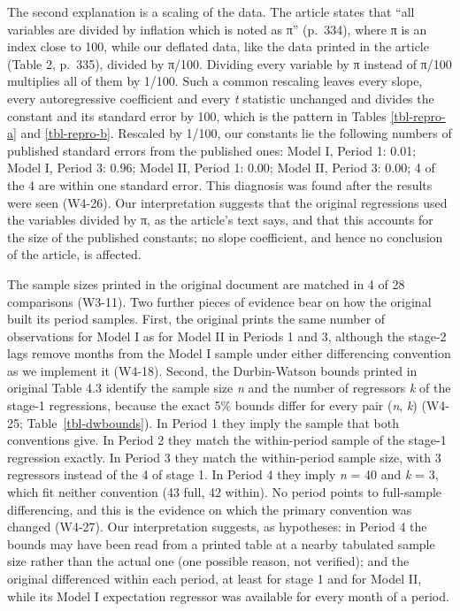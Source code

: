 \documentclass[
  12pt,
  a4paper,
]{article}
\begin{document}
The second explanation is a scaling of the data. The article states that
``all variables are divided by inflation which is noted as π'' (p.~334),
where π is an index close to 100, while our deflated data, like the data
printed in the article (Table 2, p.~335), divided by π/100. Dividing
every variable by π instead of π/100 multiplies all of them by 1/100.
Such a common rescaling leaves every slope, every autoregressive
coefficient and every \emph{t} statistic unchanged and divides the
constant and its standard error by 100, which is the pattern in Tables
\ref{tbl-repro-a} and \ref{tbl-repro-b}. Rescaled by 1/100, our
constants lie the following numbers of published standard errors from
the published ones: Model I, Period 1: 0.01; Model I, Period 3: 0.96;
Model II, Period 1: 0.00; Model II, Period 3: 0.00; 4 of the 4 are
within one standard error. This diagnosis was found after the results
were seen (W4-26). Our interpretation suggests that the original
regressions used the variables divided by π, as the article's text says,
and that this accounts for the size of the published constants; no slope
coefficient, and hence no conclusion of the article, is affected.

The sample sizes printed in the original document are matched in 4 of 28
comparisons (W3-11). Two further pieces of evidence bear on how the
original built its period samples. First, the original prints the same
number of observations for Model I as for Model II in Periods 1 and 3,
although the stage-2 lags remove months from the Model I sample under
either differencing convention as we implement it (W4-18). Second, the
Durbin-Watson bounds printed in original Table 4.3 identify the sample
size \emph{n} and the number of regressors \emph{k} of the stage-1
regressions, because the exact 5\% bounds differ for every pair
(\emph{n}, \emph{k}) (W4-25; Table~\ref{tbl-dwbounds}). In Period 1 they
imply the sample that both conventions give. In Period 2 they match the
within-period sample of the stage-1 regression exactly. In Period 3 they
match the within-period sample size, with 3 regressors instead of the 4
of stage 1. In Period 4 they imply \emph{n} = 40 and \emph{k} = 3, which
fit neither convention (43 full, 42 within). No period points to
full-sample differencing, and this is the evidence on which the primary
convention was changed (W4-27). Our interpretation suggests, as
hypotheses: in Period 4 the bounds may have been read from a printed
table at a nearby tabulated sample size rather than the actual one (one
possible reason, not verified); and the original differenced within each
period, at least for stage 1 and for Model II, while its Model I
expectation regressor was available for every month of a period.
\end{document}
